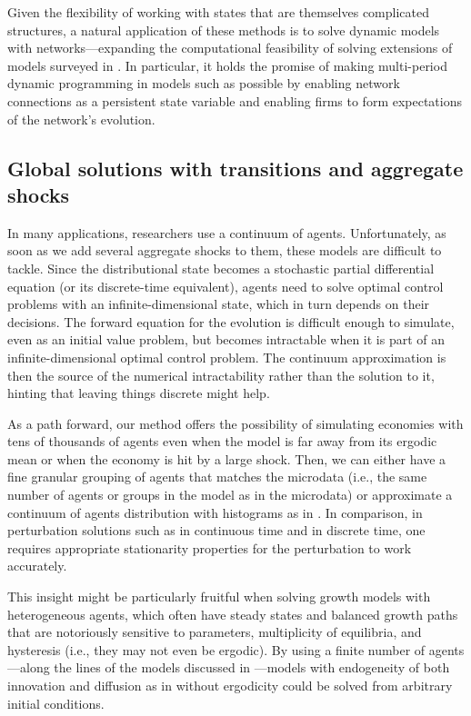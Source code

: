 \documentclass[12pt]{article}
\begin{document}
Given the flexibility of working with states that are themselves complicated structures, a natural application of these methods is to solve dynamic models with networks---expanding the computational feasibility of solving extensions of models surveyed in \citet{CarvalhoTahbazSalehi2019}. In particular, it holds the promise of making multi-period dynamic programming in models such as \citet{Oberfield2018} possible by enabling network connections as a persistent state variable and enabling firms to form expectations of the network's evolution.

\subsection{Global solutions with transitions and aggregate shocks}

In many applications, researchers use a continuum of agents. Unfortunately, as soon as we add several aggregate shocks to them, these models are difficult to tackle. Since the distributional state becomes a stochastic partial differential equation (or its discrete-time equivalent), agents need to solve optimal control problems with an infinite-dimensional state, which in turn depends on their decisions. The forward equation for the evolution is difficult enough to simulate, even as an initial value problem, but becomes intractable when it is part of an infinite-dimensional optimal control problem. The continuum approximation is then the source of the numerical intractability rather than the solution to it, hinting that leaving things discrete might help.

As a path forward, our method offers the possibility of simulating economies with tens of thousands of agents even when the model is far away from its ergodic mean or when the economy is hit by a large shock. Then, we can either have a fine granular grouping of agents that matches the microdata (i.e., the same number of agents or groups in the model as in the microdata) or approximate a continuum of agents distribution with histograms as in \citet{Mertens2018}. In comparison, in perturbation solutions such as \citet{KaplanMollViolante2018} in continuous time and \citet{DenHaan2014} in discrete time, one requires appropriate stationarity properties for the perturbation to work accurately.

This insight might be particularly fruitful when solving growth models with heterogeneous agents, which often have steady states and balanced growth paths that are notoriously sensitive to parameters, multiplicity of equilibria, and hysteresis (i.e., they may not even be ergodic). By using a finite number of agents---along the lines of the models discussed in \citet{BueraLucas2018}---models with endogeneity of both innovation and diffusion as in \citet{BenhabibPerlaTonetti2021} without ergodicity could be solved from arbitrary initial conditions.
\end{document}
